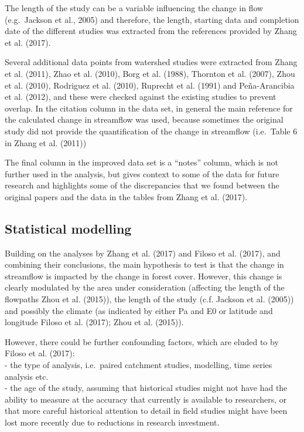 \documentclass[]{elsarticle} %
\begin{document}
The length of the study can be a variable influencing the change in flow
(e.g.~Jackson et al., 2005) and therefore, the length, starting data and
completion date of the different studies was extracted from the
references provided by Zhang et al. (2017).

Several additional data points from watershed studies were extracted
from Zhang et al. (2011), Zhao et al. (2010), Borg et al. (1988),
Thornton et al. (2007), Zhou et al. (2010), Rodriguez et al. (2010),
Ruprecht et al. (1991) and Peña-Arancibia et al. (2012), and these were
checked against the existing studies to prevent overlap. In the citation
column in the data set, in general the main reference for the calculated
change in streamflow was used, because sometimes the original study did
not provide the quantification of the change in streamflow (i.e.~Table 6
in Zhang et al. (2011))

The final column in the improved data set is a ``notes'' column, which
is not further used in the analysis, but gives context to some of the
data for future research and highlights some of the discrepancies that
we found between the original papers and the data in the tables from
Zhang et al. (2017).

\hypertarget{statistical-modelling}{%
\subsection{Statistical modelling}\label{statistical-modelling}}

Building on the analyses by Zhang et al. (2017) and Filoso et al.
(2017), and combining their conclusions, the main hypothesis to test is
that the change in streamflow is impacted by the change in forest cover.
However, this change is clearly modulated by the area under
consideration (affecting the length of the flowpaths Zhou et al.
(2015)), the length of the study (c.f. Jackson et al. (2005)) and
possibly the climate (as indicated by either Pa and E0 or latitude and
longitude Filoso et al. (2017); Zhou et al. (2015)).

However, there could be further confounding factors, which are eluded to
by Filoso et al. (2017):\\
- the type of analysis, i.e.~paired catchment studies, modelling, time
series analysis etc.\\
- the age of the study, assuming that historical studies might not have
had the ability to measure at the accuracy that currently is available
to researchers, or that more careful historical attention to detail in
field studies might have been lost more recently due to reductions in
research investment.
\end{document}
